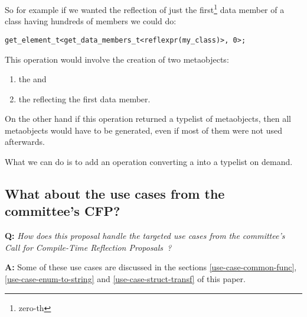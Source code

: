 So for example if we wanted the reflection of just the first\footnote
{zero-th} data member of a class having hundreds of members we could do:

\begin{verbatim}
get_element_t<get_data_members_t<reflexpr(my_class)>, 0>;
\end{verbatim}

This operation would involve the creation of two metaobjects:
\begin{enumerate}
	\item the  and
	\item the  reflecting the first data member.
\end{enumerate}

On the other hand if this operation returned a typelist of metaobjects,
then all metaobjects would have to be generated, even if most of them
were not used afterwards.

What we can do is to add an operation converting a 
into a typelist on demand.

\subsection{What about the use cases from the committee's CFP?}

\textbf{Q:} {\em How does this proposal handle the targeted use cases
from the committee's Call for Compile-Time Reflection
Proposals~\cite{ISOCPP-N3814}?}

\textbf{A:} Some of these use cases are discussed in the sections
\ref{use-case-common-func}, \ref{use-case-enum-to-string}
and \ref{use-case-struct-transf} of this paper.

